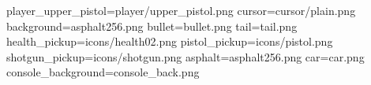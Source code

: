 player_upper_pistol=player/upper_pistol.png
cursor=cursor/plain.png
background=asphalt256.png
bullet=bullet.png
tail=tail.png
health_pickup=icons/health02.png
pistol_pickup=icons/pistol.png
shotgun_pickup=icons/shotgun.png
asphalt=asphalt256.png
car=car.png
console_background=console_back.png

